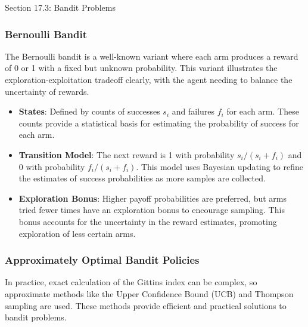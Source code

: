 \begin{notes}{Section 17.3: Bandit Problems}
\begin{highlight}
    \end{highlight}
    
    \subsubsection*{Bernoulli Bandit}
    
    The Bernoulli bandit is a well-known variant where each arm produces a reward of 0 or 1 with a fixed but unknown probability. This variant illustrates the exploration-exploitation tradeoff clearly, 
    with the agent needing to balance the uncertainty of rewards.
    
    \begin{highlight}
    
        \begin{itemize}
            \item \textbf{States}: Defined by counts of successes \(s_i\) and failures \(f_i\) for each arm. These counts provide a statistical basis for estimating the probability of success for each arm.
            \item \textbf{Transition Model}: The next reward is 1 with probability \(s_i/(s_i + f_i)\) and 0 with probability \(f_i/(s_i + f_i)\). This model uses Bayesian updating to refine the 
            estimates of success probabilities as more samples are collected.
            \item \textbf{Exploration Bonus}: Higher payoff probabilities are preferred, but arms tried fewer times have an exploration bonus to encourage sampling. This bonus accounts for the uncertainty 
            in the reward estimates, promoting exploration of less certain arms.
        \end{itemize}
    
    \end{highlight}
    
    \subsubsection*{Approximately Optimal Bandit Policies}
    
    In practice, exact calculation of the Gittins index can be complex, so approximate methods like the Upper Confidence Bound (UCB) and Thompson sampling are used. These methods provide efficient and 
    practical solutions to bandit problems.
    
    \begin{highlight}
    

\end{highlight}
\end{notes}
